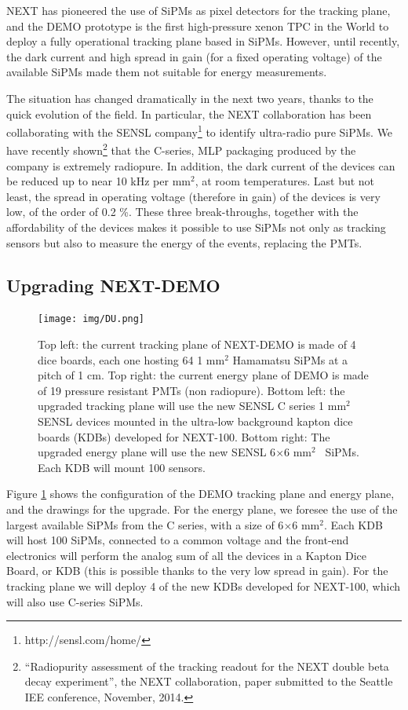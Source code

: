 NEXT has pioneered the use of SiPMs as pixel detectors for the tracking plane, and the DEMO prototype is the first high-pressure xenon TPC in the World to deploy a fully operational tracking plane based in SiPMs. However, until recently, the dark current and high spread in gain (for a fixed operating voltage) of the available SiPMs made them not suitable for energy measurements.

The situation has changed dramatically in the next two years, thanks to the quick evolution of the field. In particular, the NEXT collaboration has been collaborating with the SENSL company\footnote{http://sensl.com/home/} to identify ultra-radio pure SiPMs. We have recently shown\footnote{``Radiopurity assessment of the tracking readout for
the NEXT double beta decay experiment'', the NEXT collaboration, paper submitted to the Seattle IEE conference, November, 2014.} that the C-series, MLP packaging produced by the company is extremely radiopure. In addition, the dark current of the devices can be reduced up to near 10 kHz per mm$^2$, at room temperatures. 
Last but not least, the spread in operating voltage (therefore in gain) of the devices is very low, of the order of 0.2 \%. 
These three break-throughs, together with the affordability of the devices makes it possible to use SiPMs not only as tracking sensors but also to measure the energy of the events, replacing the PMTs. 

\subsection*{Upgrading NEXT-DEMO}
\begin{figure}
\centering
\texttt{[image: img/DU.png]}
\caption{\small Top left: the current tracking plane of NEXT-DEMO is made of 4 dice boards, each one hosting 64 1 mm$^2$ Hamamatsu SiPMs at a pitch of 1 cm. Top right: the current energy plane of DEMO is made of 19 pressure resistant PMTs (non radiopure). Bottom left: the upgraded tracking plane will use the new SENSL C series 1 mm$^2$ SENSL devices mounted in the ultra-low background kapton dice boards (KDBs) developed for NEXT-100.  Bottom right: The upgraded energy plane will use the new SENSL 6$\times$6 mm$^2$~ SiPMs. Each KDB will mount 100 sensors. } \label{fig.DemoUpgrade}
\end{figure}

Figure \ref{fig.DemoUpgrade} shows the configuration of the DEMO tracking plane and energy plane, and the drawings for the upgrade. For the energy plane, we foresee the use of the largest available SiPMs from the C series, with a size of 6$\times$6 mm$^2$. Each KDB will host 100 SiPMs, connected to a common voltage and the front-end electronics will perform the analog sum of all the devices in a Kapton Dice Board, or KDB (this is possible thanks to the very low spread in gain). For the tracking plane we will deploy 4 of the new KDBs developed for NEXT-100, which will also use C-series SiPMs. 

